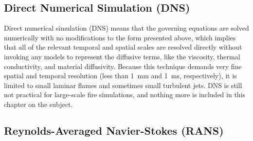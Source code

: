 \documentclass[graybox]{svmult}
\begin{document}
\subsection{Direct Numerical Simulation (DNS)}

Direct numerical simulation (DNS) means that the governing equations are solved numerically with no modifications to the form presented above, which implies that all of the relevant temporal and spatial scales are resolved directly without invoking any models to represent the diffusive terms, like the viscosity, thermal conductivity, and material diffusivity. Because this technique demands very fine spatial and temporal resolution (less than 1~mm and 1~ms, respectively), it is limited to small laminar flames and sometimes small turbulent jets. DNS is still not practical for large-scale fire simulations, and nothing more is included in this chapter on the subject.

\subsection{Reynolds-Averaged Navier-Stokes (RANS)}
\end{document}

